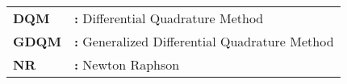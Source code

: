 \hspace{-3mm}
\begin{tabular}{p{2cm}l}
{\bf{DQM}} & {\bf:} Differential Quadrature Method\\
{\bf GDQM} & {\bf:} Generalized Differential Quadrature Method\\
{\bf NR} & {\bf:} Newton Raphson\\
\end{tabular}

